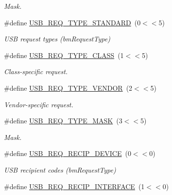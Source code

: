 \begin{DoxyCompactItemize}
\begin{DoxyCompactList}\small\item\em Mask. \end{DoxyCompactList}\item 
\#define \hyperlink{group__usb__protocol__group_ga3eb781776ab6dcbc6fa96e1b0ed18011}{U\-S\-B\-\_\-\-R\-E\-Q\-\_\-\-T\-Y\-P\-E\-\_\-\-S\-T\-A\-N\-D\-A\-R\-D}~(0$<$$<$5)
\begin{DoxyCompactList}\small\item\em U\-S\-B request types (bm\-Request\-Type) \end{DoxyCompactList}\item 
\hypertarget{group__usb__protocol__group_gaff9ee0044c6cb131b2908356adc37dff}{\#define \hyperlink{group__usb__protocol__group_gaff9ee0044c6cb131b2908356adc37dff}{U\-S\-B\-\_\-\-R\-E\-Q\-\_\-\-T\-Y\-P\-E\-\_\-\-C\-L\-A\-S\-S}~(1$<$$<$5)}\label{group__usb__protocol__group_gaff9ee0044c6cb131b2908356adc37dff}

\begin{DoxyCompactList}\small\item\em Class-\/specific request. \end{DoxyCompactList}\item 
\hypertarget{group__usb__protocol__group_ga71855621792f72443ed5497b313a2517}{\#define \hyperlink{group__usb__protocol__group_ga71855621792f72443ed5497b313a2517}{U\-S\-B\-\_\-\-R\-E\-Q\-\_\-\-T\-Y\-P\-E\-\_\-\-V\-E\-N\-D\-O\-R}~(2$<$$<$5)}\label{group__usb__protocol__group_ga71855621792f72443ed5497b313a2517}

\begin{DoxyCompactList}\small\item\em Vendor-\/specific request. \end{DoxyCompactList}\item 
\hypertarget{group__usb__protocol__group_ga8be8332e2da1e54c74c5f2a2230b0a28}{\#define \hyperlink{group__usb__protocol__group_ga8be8332e2da1e54c74c5f2a2230b0a28}{U\-S\-B\-\_\-\-R\-E\-Q\-\_\-\-T\-Y\-P\-E\-\_\-\-M\-A\-S\-K}~(3$<$$<$5)}\label{group__usb__protocol__group_ga8be8332e2da1e54c74c5f2a2230b0a28}

\begin{DoxyCompactList}\small\item\em Mask. \end{DoxyCompactList}\item 
\#define \hyperlink{group__usb__protocol__group_ga65c1569b970837dd4a2ad8e1b4097589}{U\-S\-B\-\_\-\-R\-E\-Q\-\_\-\-R\-E\-C\-I\-P\-\_\-\-D\-E\-V\-I\-C\-E}~(0$<$$<$0)
\begin{DoxyCompactList}\small\item\em U\-S\-B recipient codes (bm\-Request\-Type) \end{DoxyCompactList}\item 
\hypertarget{group__usb__protocol__group_gad3d0e7d70c610967cc2ee12c5298ac69}{\#define \hyperlink{group__usb__protocol__group_gad3d0e7d70c610967cc2ee12c5298ac69}{U\-S\-B\-\_\-\-R\-E\-Q\-\_\-\-R\-E\-C\-I\-P\-\_\-\-I\-N\-T\-E\-R\-F\-A\-C\-E}~(1$<$$<$0)}\label{group__usb__protocol__group_gad3d0e7d70c610967cc2ee12c5298ac69}


\end{DoxyCompactItemize}
